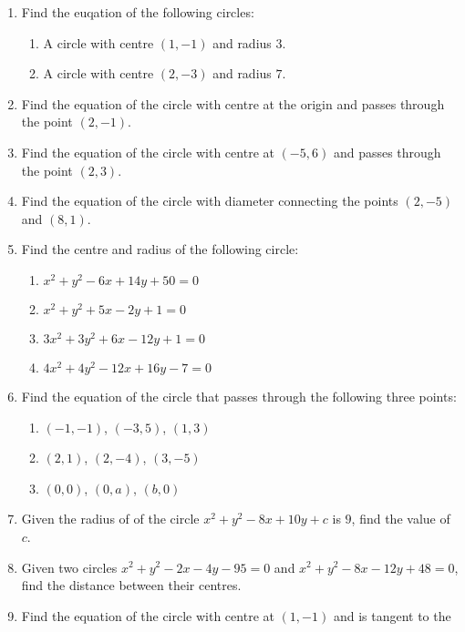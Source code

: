 \documentclass{report}
\begin{document}
\begin{multicols}{2}
    \begin{enumerate}
        \item Find the euqation of the following circles:
              \begin{enumerate}
                  \item A circle with centre $(1, -1)$ and radius $3$.
                  \item A circle with centre $(2, -3)$ and radius $7$.
              \end{enumerate}
        \item Find the equation of the circle with centre at the origin and passes through
              the point $(2, -1)$.
        \item Find the equation of the circle with centre at $(-5, 6)$ and passes through the
              point $(2, 3)$.
        \item Find the equation of the circle with diameter connecting the points $(2, -5)$
              and $(8, 1)$.
        \item Find the centre and radius of the following circle:
              \begin{enumerate}
                  \item $x^2 + y^2 - 6x + 14y + 50 = 0$
                  \item $x^2 + y^2 + 5x - 2y + 1 = 0$
                  \item $3x^2 + 3y^2 + 6x - 12y + 1 = 0$
                  \item $4x^2 + 4y^2 - 12x + 16y - 7 = 0$
              \end{enumerate}
        \item Find the equation of the circle that passes through the following three points:
              \begin{enumerate}
                  \item $(-1, -1)$, $(-3, 5)$, $(1, 3)$
                  \item $(2, 1)$, $(2, -4)$, $(3, -5)$
                  \item $(0, 0)$, $(0, a)$, $(b, 0)$
              \end{enumerate}
        \item Given the radius of of the circle $x^2 + y^2 - 8x + 10y + c$ is $9$, find the
              value of $c$.
        \item Given two circles $x^2 + y^2 - 2x - 4y - 95 = 0$ and $x^2 + y^2 - 8x - 12y + 48
                  = 0$, find the distance between their centres.
        \item Find the equation of the circle with centre at $(1, -1)$ and is tangent to the

\end{enumerate}
\end{multicols}
\end{document}
